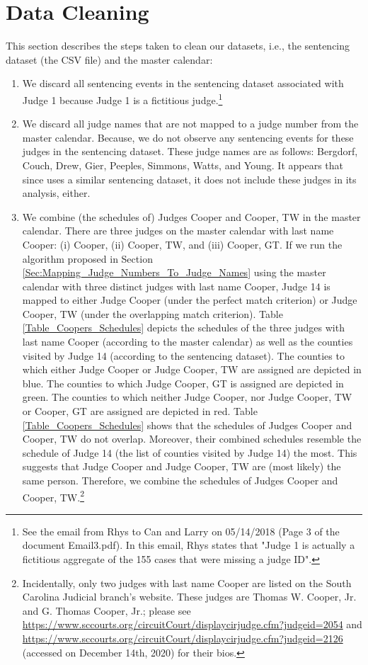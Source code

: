 \documentclass[11pt, oneside]{article}   	%
\theoremstyle{ModifiedStyle}
\begin{document}
\section{Data Cleaning}
\label{Sec:Appendix:Data_Cleaning}
This section describes the steps taken to clean our datasets, i.e., the sentencing dataset (the CSV file) and the master calendar:
\begin{enumerate}
	\item We discard all sentencing events in the sentencing dataset associated with Judge 1 because Judge 1 is a fictitious judge.\footnote{See the email from Rhys to Can and Larry on 05/14/2018 (Page 3 of the document Email3.pdf). In this email, Rhys states that "Judge 1 is actually a fictitious aggregate of the 155 cases that were missing a judge ID".}
	\item We discard all judge names that are not mapped to a judge number from the master calendar. Because, we do not observe any sentencing events for these judges in the sentencing dataset. These judge names are as follows: Bergdorf, Couch, Drew, Gier, Peeples, Simmons, Watts, and Young. It appears that since \citet{Hester_Hartman_2017} uses a similar sentencing dataset, it does not include these judges in its analysis, either.
	\item We combine (the schedules of) Judges Cooper and Cooper, TW in the master calendar. There are three judges on the master calendar with last name Cooper: (i) Cooper, (ii) Cooper, TW, and (iii) Cooper, GT. If we run the algorithm proposed in Section \ref{Sec:Mapping_Judge_Numbers_To_Judge_Names} using the master calendar with three distinct judges with last name Cooper, Judge 14 is mapped to either Judge Cooper (under the perfect match criterion) or Judge Cooper, TW (under the overlapping match criterion). Table \ref{Table_Coopers_Schedules} depicts the schedules of the three judges with last name Cooper (according to the master calendar) as well as the counties visited by Judge 14 (according to the sentencing dataset). The counties to which either Judge Cooper or Judge Cooper, TW are assigned are depicted in blue. The counties to which Judge Cooper, GT is assigned are depicted in green. The counties to which neither Judge Cooper, nor Judge Cooper, TW or Cooper, GT are assigned are depicted in red. Table \ref{Table_Coopers_Schedules} shows that the schedules of Judges Cooper and Cooper, TW do not overlap. Moreover, their combined schedules resemble the schedule of Judge 14 (the list of counties visited by Judge 14) the most. This suggests that Judge Cooper and Judge Cooper, TW are (most likely) the same person. Therefore, we combine the schedules of Judges Cooper and Cooper, TW.\footnote{Incidentally, only two judges with last name Cooper are listed on the South Carolina Judicial branch's website. These judges are Thomas W. Cooper, Jr. and G. Thomas Cooper, Jr.; please see \url{https://www.sccourts.org/circuitCourt/displaycirjudge.cfm?judgeid=2054} and \url{https://www.sccourts.org/circuitCourt/displaycirjudge.cfm?judgeid=2126} (accessed on December 14th, 2020) for their bios.}
\end{enumerate}
\end{document}
